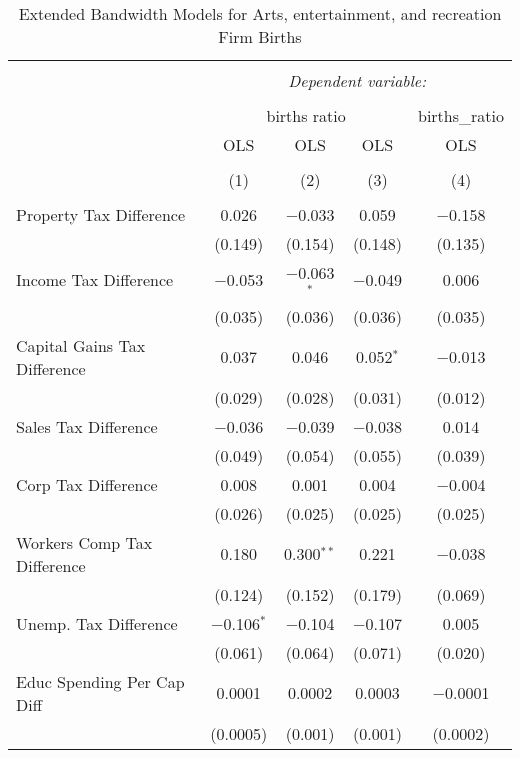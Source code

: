 
\begin{table}[!htbp] \centering 
  \caption{Extended Bandwidth Models for  Arts, entertainment, and recreation Firm Births} 
  \label{71eb} 
\begin{tabular}{@{\extracolsep{5pt}}lcccc} 
\\[-1.8ex]\hline 
\hline \\[-1.8ex] 
 & \multicolumn{4}{c}{\textit{Dependent variable:}} \\ 
\cline{2-5} 
\\[-1.8ex] & \multicolumn{3}{c}{births ratio} & births\_ratio \\ 
 & OLS & OLS & OLS & OLS \\ 
\\[-1.8ex] & (1) & (2) & (3) & (4)\\ 
\hline \\[-1.8ex] 
 Property Tax Difference & 0.026 & $-$0.033 & 0.059 & $-$0.158 \\ 
  & (0.149) & (0.154) & (0.148) & (0.135) \\ 
  Income Tax Difference & $-$0.053 & $-$0.063$^{*}$ & $-$0.049 & 0.006 \\ 
  & (0.035) & (0.036) & (0.036) & (0.035) \\ 
  Capital Gains Tax Difference & 0.037 & 0.046 & 0.052$^{*}$ & $-$0.013 \\ 
  & (0.029) & (0.028) & (0.031) & (0.012) \\ 
  Sales Tax Difference & $-$0.036 & $-$0.039 & $-$0.038 & 0.014 \\ 
  & (0.049) & (0.054) & (0.055) & (0.039) \\ 
  Corp Tax Difference & 0.008 & 0.001 & 0.004 & $-$0.004 \\ 
  & (0.026) & (0.025) & (0.025) & (0.025) \\ 
  Workers Comp Tax Difference & 0.180 & 0.300$^{**}$ & 0.221 & $-$0.038 \\ 
  & (0.124) & (0.152) & (0.179) & (0.069) \\ 
  Unemp. Tax Difference & $-$0.106$^{*}$ & $-$0.104 & $-$0.107 & 0.005 \\ 
  & (0.061) & (0.064) & (0.071) & (0.020) \\ 
  Educ Spending Per Cap Diff & 0.0001 & 0.0002 & 0.0003 & $-$0.0001 \\ 
  & (0.0005) & (0.001) & (0.001) & (0.0002) \\ 

\end{tabular}
\end{table}
